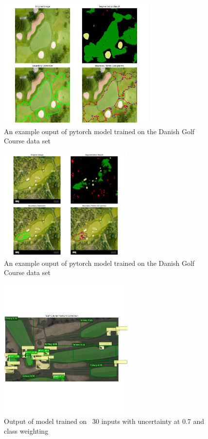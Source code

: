 \documentclass[final]{cmpreport_02}
\begin{document}
\begin{figure}[h!]
	\centering
	\includegraphics[width=0.7\textwidth]{./images/AdobeGolf_visualisation.png}
	\caption{An example ouput of pytorch model trained on the Danish Golf Course data set}
	\label{am:AGDanish}
\end{figure}

\begin{figure}[h!]
	\centering
	\includegraphics[width=0.6\textwidth]{./images/overheadGolfCourse_visualisation.png}
	\caption{An example ouput of pytorch model trained on the Danish Golf Course data set}
	\label{am:ohGCDanish}
\end{figure}

\begin{figure}[h!]
	\centering
	\includegraphics[width=0.6\textwidth]{./images/AENoRoughDemoTraining.png}
	\caption{Output of model trained on ~30 inputs with uncertainty at 0.7 and class weighting}
	\label{am:AENoRoughDemoTraining}
\end{figure}
\end{document}
